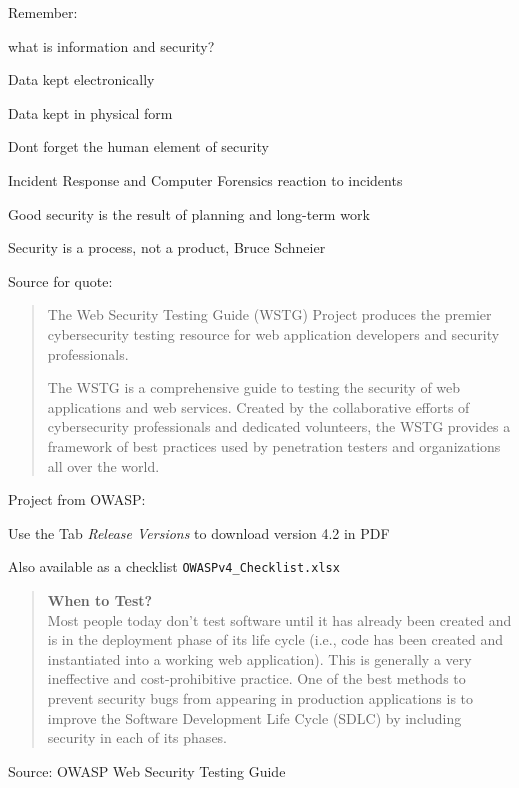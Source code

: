 \documentclass[Screen16to9,17pt]{foils}
\begin{document}

\begin{list1}
\item Remember:
\begin{list2}
\item what is information and security?
\item Data kept electronically
\item Data kept in physical form
\item Dont forget the human element of security
\end{list2}
\item Incident Response and Computer Forensics reaction to incidents
\item Good security is the result of planning and long-term work
\end{list1}
\vskip 1cm
\centerline{\color{titlecolor}\LARGE Security is a process, not a product, Bruce Schneier}

Source for quote: 


\begin{quote}
The Web Security Testing Guide (WSTG) Project produces the premier cybersecurity
testing resource for web application developers and security professionals.

The WSTG is a comprehensive guide to testing the security of web applications and
web services. Created by the collaborative efforts of cybersecurity professionals
and dedicated volunteers, the WSTG provides a framework of best practices used by
penetration testers and organizations all over the world.
\end{quote}

\begin{list2}
\item Project from OWASP:\\
\item Use the Tab \emph{Release Versions} to download version 4.2 in PDF
\item Also available as a checklist \verb+OWASPv4_Checklist.xlsx+
\end{list2}




\begin{quote}\small{\bf
When to Test?}\\
Most people today don’t test software until it has already been created and is in the deployment phase of its life cycle (i.e., code has been created and instantiated into a working web application). This is generally a very ineffective and cost-prohibitive practice. One of the best methods to prevent security bugs from appearing in production applications is to improve the Software Development Life Cycle (SDLC) by including security in each of its phases.
\end{quote}
Source: OWASP Web Security Testing Guide
\end{document}
